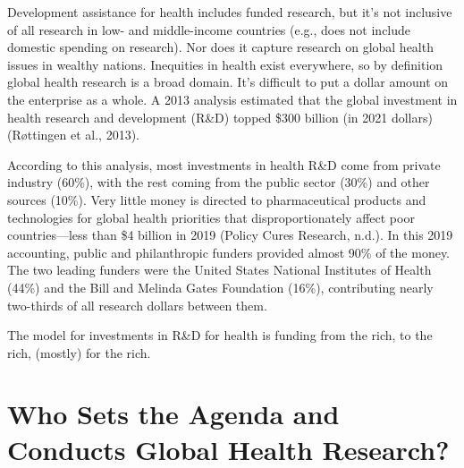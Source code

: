 \documentclass[
  letterpaper,
  DIV=11,
  numbers=noendperiod,
  oneside]{scrreprt}
\begin{document}
Development assistance for health includes funded research, but it's not
inclusive of all research in low- and middle-income countries (e.g.,
does not include domestic spending on research). Nor does it capture
research on global health issues in wealthy nations. Inequities in
health exist everywhere, so by definition global health research is a
broad domain. It's difficult to put a dollar amount on the enterprise as
a whole. A 2013 analysis estimated that the global investment in health
research and development (R\&D) topped \$300 billion (in 2021 dollars)
(Røttingen et al.,
2013).

According to this analysis, most investments in health R\&D come from
private industry (60\%), with the rest coming from the public sector
(30\%) and other sources (10\%). Very little money is directed to
pharmaceutical products and technologies for global health priorities
that disproportionately affect poor countries---less than \$4 billion in
2019 (Policy Cures Research,
n.d.).
In this 2019 accounting, public and philanthropic funders provided
almost 90\% of the money. The two leading funders were the United States
National Institutes of Health (44\%) and the Bill and Melinda Gates
Foundation (16\%), contributing nearly two-thirds of all research
dollars between them.

The model for investments in R\&D for health is funding from the rich,
to the rich, (mostly) for the rich.

\hypertarget{who-sets-the-agenda-and-conducts-global-health-research}{%
\section{Who Sets the Agenda and Conducts Global Health
Research?}\label{who-sets-the-agenda-and-conducts-global-health-research}}
\end{document}
